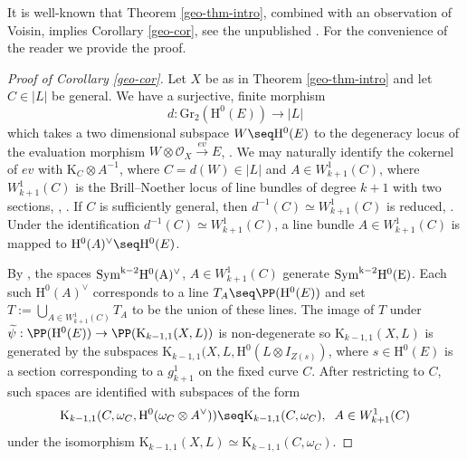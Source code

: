 It is well-known that Theorem \ref{geo-thm-intro}, combined with an observation of Voisin, implies Corollary \ref{geo-cor}, see the unpublished \cite[\S 11]{bothmer-preprint}. For the convenience of the reader we provide the proof.
\begin{proof}[Proof of Corollary \ref{geo-cor}]
Let $X$ be as in Theorem \ref{geo-thm-intro} and let $C \in |L|$ be general. We have a surjective, finite morphism
$$d: \mathrm{Gr}_2(\mathrm{H}^0(E)) \to |L|$$
which takes a two dimensional subspace $W \seq \mathrm{H}^0(E)$ to the degeneracy locus of the evaluation morphism $W \otimes \mathcal{O}_X \xrightarrow{ev} E$, \cite{V1}. We may naturally identify the cokernel of $ev$ with $\mathrm{K}_C \otimes A^{-1}$, where $C=d(W) \in |L|$ and $A \in W^1_{k+1}(C)$, where $W^1_{k+1}(C)$ is the Brill--Noether locus of line bundles of degree $k+1$ with two sections, \cite{lazarsfeld-BNP}, \cite{aprodu-farkas}. If $C$ is sufficiently general, then $d^{-1}(C) \simeq W^1_{k+1}(C)$ is reduced, \cite{lazarsfeld-BNP}. Under the identification $d^{-1}(C) \simeq W^1_{k+1}(C)$, a line bundle $A \in W^1_{k+1}(C)$ is mapped to $\mathrm{H}^0(A)^{\vee}\seq \mathrm{H}^0(E)$.


 By \cite[Proof of Prop.\ 7]{V1}, the spaces $\rm{Sym}^{k-2}\mathrm{H}^0(A)^{\vee}$, $A \in W^1_{k+1}(C)$ generate $\rm{Sym}^{k-2}\mathrm{H}^0(E)$. Each such $\mathrm{H}^0(A)^{\vee}$ corresponds to a line $T_A \seq \PP(\mathrm{H}^0(E))$ and set ${T:=\bigcup_{A \in W^1_{k+1}(C)} T_A}$ to be the union of these lines. The image of $T$ under $\widetilde{\psi}: \PP(\mathrm{H}^0(E)) \to \PP(\mathrm{K}_{k-1,1}(X,L))$ is non-degenerate so $\mathrm{K}_{k-1,1}(X,L)$ is generated by the subspaces $\mathrm{K}_{k-1,1}(X,L, \mathrm{H}^0(L \otimes I_{Z(s)})$, where $s \in \mathrm{H}^0(E)$ is a section corresponding to a $g^1_{k+1}$ on the fixed curve $C$. After restricting to $C$, such spaces are identified with subspaces of the form $$\mathrm{K}_{k-1,1}(C,\omega_C, \mathrm{H}^0(\omega_C \otimes A^{\vee})) \seq \mathrm{K}_{k-1,1}(C,\omega_C),\; \; A \in W^1_{k+1}(C)$$ under the isomorphism $\mathrm{K}_{k-1,1}(X,L) \simeq \mathrm{K}_{k-1,1}(C, \omega_C)$.
\end{proof}
